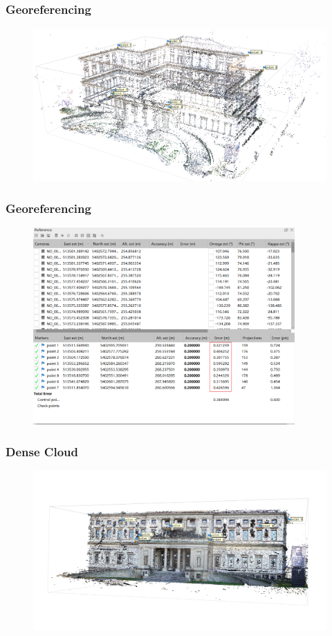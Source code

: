 \documentclass{beamer}
\begin{document}
	\begin{frame}
		\frametitle{Georeferencing}
		\begin{figure}[r]
			\includegraphics[width=12cm]{reference (GCPS)}
		\end{figure}	\end{frame}
		\begin{frame}
		\frametitle{Georeferencing}
		\begin{figure}[r]
			\includegraphics[width=10cm]{reference}
	\end{figure}	\end{frame}
\begin{frame}
\frametitle{Dense Cloud}
	\begin{figure}[r]
	\includegraphics[width=12cm]{Dense Cloud 1}
\end{figure}\end{frame}
\end{document}

